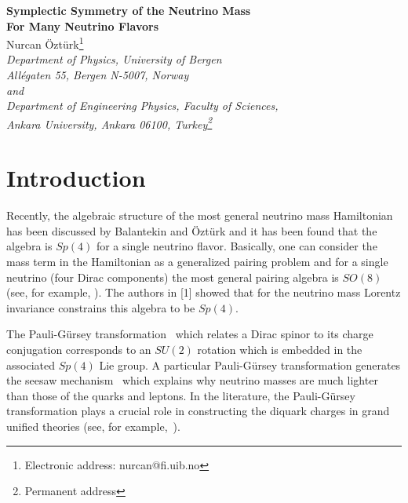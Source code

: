 \documentclass[a4paper,12pt]{article}
\begin{document}
\begin{center}
{\bf \Large Symplectic Symmetry of the Neutrino Mass\\[0.2cm]
For Many Neutrino Flavors}\\[0pt]
\vspace{0.5cm}
{\large Nurcan \"Ozt\"urk\footnote{Electronic address:
nurcan@fi.uib.no}}\\[0pt]\vspace{0.5cm}
{\it Department of Physics, University of Bergen\\ All\'{e}gaten 55, Bergen 
N-5007, Norway\\ and\\ 
Department of Engineering Physics, Faculty of Sciences,\\ Ankara University, 
Ankara 06100, Turkey\footnote{Permanent address}}
\end{center}
\vspace{0.3cm}
\begin{abstract}
\par\noindent
The algebraic structure of the neutrino
mass Hamiltonian is presented for two neutrino flavors  considering
both Dirac and Majorana mass terms. It is shown that the algebra is $Sp(8)$ 
and also discussed how the algebraic structure generalizes for the case 
of more than two neutrino flavors.
\vspace{0.2cm}
\par\noindent
PACS: 14.60.Pq, 11.30.Na
\end{abstract}
\vspace{0.2cm}                                    

\section{Introduction}

Recently, the algebraic structure of the most general neutrino mass 
Hamiltonian has been 
discussed by Balantekin and \"Ozt\"urk  \cite{baha}
and it has been found that the algebra is $Sp(4)$ for a single neutrino 
flavor. 
Basically, one can consider the mass term in the Hamiltonian as a 
generalized pairing
problem and for a single neutrino (four Dirac components) the most
general pairing algebra is $SO(8)$ (see, for example, \cite{pere}). 
The authors in [1]
showed that for the neutrino mass Lorentz invariance constrains this
algebra to be $Sp(4)$. 

The Pauli-G\"ursey transformation~\cite{pauli,gursey} which relates a Dirac spinor to its 
charge conjugation corresponds to an $SU(2)$ rotation 
which is 
embedded in the  associated $Sp(4)$ Lie group. A particular Pauli-G\"ursey 
transformation generates the seesaw mechanism~\cite{seesaw} which explains why
neutrino masses are much lighter than those of the quarks and leptons. 
In the literature, the Pauli-G\"ursey transformation plays a crucial role in 
constructing the diquark charges in grand unified theories 
(see, for example,~\cite{saclioglu}). 
\end{document}
